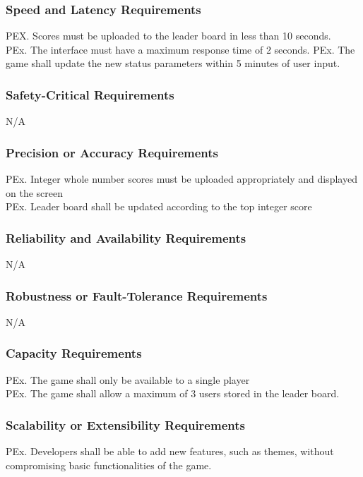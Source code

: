 \documentclass{article}
\begin{document}
    \subsubsection{Speed and Latency Requirements}
    PEX. Scores must be uploaded to the leader board in less than 10 seconds.\\
    PEx. The interface must have a maximum response time of 2 seconds.
    PEx. The game shall update the new status parameters within 5 minutes of user input.

    \subsubsection{Safety-Critical Requirements}
    N/A
    
    \subsubsection{Precision or Accuracy Requirements}
    PEx. Integer whole number scores must be uploaded appropriately and displayed on the screen\\
    PEx. Leader board shall be updated according to the top integer score
    
    \subsubsection{Reliability and Availability Requirements}
    N/A

    \subsubsection{Robustness or Fault-Tolerance Requirements}
    N/A
    
    \subsubsection{Capacity Requirements}
    PEx. The game shall only be available to a single player\\
    PEx. The game shall allow a maximum of 3 users stored in the leader board.
    
    \subsubsection{Scalability or Extensibility Requirements}
    PEx. Developers shall be able to add new features, such as themes, without compromising basic functionalities of the game. 
    
\end{document}
